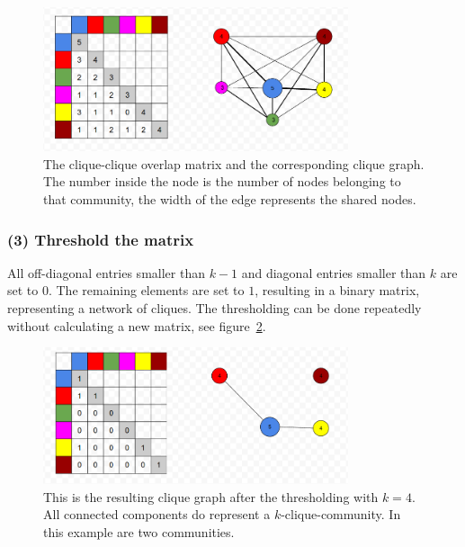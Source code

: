 \documentclass[runningheads,a4paper]{llncs}
\begin{document}
\begin{figure}
\begin{center}
	\includegraphics[width=0.8\textwidth]{matrix.png}
		\caption{The clique-clique overlap matrix and the corresponding clique graph. The number inside the node is the number of nodes belonging to that community, the width of the edge represents the shared nodes.}
		\label{fig:matrix}
\end{center}		
\end{figure}


\subsubsection{(3) Threshold the matrix}
All off-diagonal entries smaller than $k-1$ and diagonal entries smaller than $k$ are set to $0$.
The remaining elements are set to $1$, resulting in a binary matrix, representing a network of cliques. The thresholding can be done repeatedly without calculating a new matrix, see figure~\ref{fig:matrixtrashed}.

\begin{figure}
\begin{center}
	\includegraphics[width=0.8\textwidth]{matrixtrashed}
		\caption{This is the resulting clique graph after the thresholding with $k=4$. All connected components do represent a $k$-clique-community. In this example are two communities.}
		\label{fig:matrixtrashed}
\end{center}
\end{figure}
 
\end{document}
